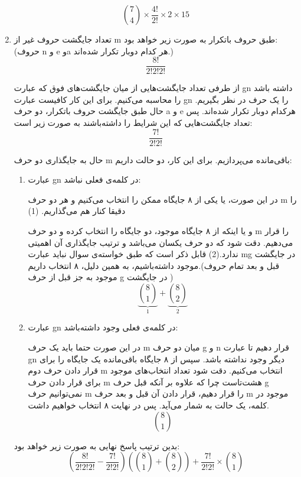 \begin{enumerate}
    $${7\choose 4} \times \frac{4!}{2!} \times 2 \times 15$$
    \item
    تعداد جایگشت حروف غیر از m
    طبق حروف باتکرار به صورت زیر خواهد بود:
    (حروف n و e وa هر کدام دوبار تکرار شده‌اند.)
    $$\frac{8!}{2!2!2!}$$
    
    از طرفی تعداد جایگشت‌هایی از میان جایگشت‌های فوق که عبارت gn داشته باشد را محاسبه می‌کنیم. برای این کار کافیست عبارت gn را یک حرف در نظر بگیریم. حال طبق جایگشت حروف باتکرار، دو حرف a و e هرکدام دوبار تکرار شده‌اند. پس تعداد جایگشت‌هایی که این شرایط را داشته‌باشند به صورت زیر است:
    $$\frac{7!}{2!2!}$$
    
    حال به جایگذاری دو حرف m باقی‌مانده می‌پردازیم. برای این کار، دو حالت داریم:
    \begin{enumerate}
      \item 
      عبارت gn در کلمه‌ی فعلی نباشد:
      
      در این صورت، یا یکی از ۸ جایگاه ممکن را انتخاب می‌کنیم و هر دو حرف m را دقیقا کنار هم می‌گذاریم.
      (1)
      
      و یا اینکه از ۸ جایگاه موجود، دو جایگاه را انتخاب کرده و دو حرف m را قرار می‌دهیم. دقت شود که دو حرف یکسان می‌باشد و ترتیب جایگذاری آن اهمیتی ندارد.(2)
      قابل ذکر است که طبق خواسته‌ی سوال نباید عبارت  mg در جایگشت موجود داشته‌باشیم، به همین دلیل، ۸ انتخاب داریم.(قبل و بعد تمام حروف موجود به جز قبل از حرف g در جایگشت )
      $$\underbrace{8\choose 1}_{1} + \underbrace{8\choose 2}_{2}$$
      \item
      عبارت gn در کلمه‌ی فعلی وجود داشته‌باشد:
      
      در این صورت حتما باید یک حرف m میان دو حرف 
      g و n قرار دهیم تا عبارت gn دیگر وجود نداشته باشد.
      سپس از ۸ جایگاه باقی‌مانده یک جایگاه را برای قرار دادن حرف دوم m انتخاب می‌کنیم. دقت شود تعداد انتخاب‌های موجود برای قرار دادن حرف m هشت‌تاست چرا که علاوه بر آنکه قبل حرف g نمی‌توانیم حرف m را قرار دهیم، قرار دادن آن قبل و بعد حرف m موجود در کلمه، یک حالت به شمار می‌آید. پس در نهایت ۸ انتخاب خواهیم داشت.
      $${8\choose 1}$$
    \end{enumerate}
    بدین ترتیب پاسخ نهایی به صورت زیر خواهد بود:
    $$(\frac{8!}{2!2!2!} - \frac{7!}{2!2!})({8\choose 1} + {8\choose 2}) + \frac{7!}{2!2!} \times {8\choose 1}$$
  \end{enumerate}

